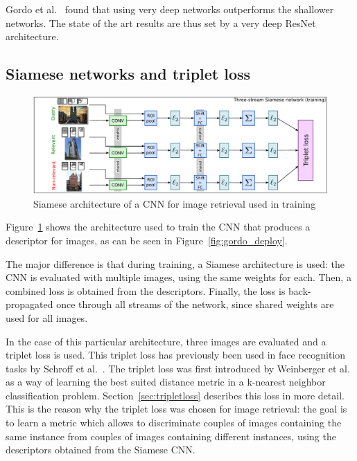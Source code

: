 Gordo et al.~\cite{gordo_deep_2016} found that using very deep networks
outperforms the shallower networks. The state of the art results are
thus set by a very deep ResNet architecture.

\subsection{Siamese networks and triplet loss}
\begin{figure}
\includegraphics[width=\textwidth]{img/gordo_deepimageretrievalarc.png}
\caption{Siamese architecture of a CNN for image retrieval used in
training~\cite{gordo_deep_2016}
\label{fig:gordo_train}}
\end{figure}

Figure~\ref{fig:gordo_train} shows the architecture used to train the CNN
that produces a descriptor for images, as can be seen in
Figure~\ref{fig:gordo_deploy}.

The major difference is that during training, a Siamese architecture is
used: the CNN is evaluated with multiple images, using the same weights
for each. Then, a combined loss is obtained from the descriptors.
Finally, the loss is back-propagated once through all streams of the network,
since shared weights are used for all images.

In the case of this particular architecture, three images are evaluated
and a triplet loss is used. This triplet loss has previously been used
in face recognition tasks by Schroff et al.~\cite{schroff_facenet:_2015}.
The triplet loss was first introduced by
Weinberger et al.~\cite{weinberger_distance_2006} as a way of learning
the best suited distance metric in a k-nearest neighbor classification
problem. Section~\ref{sec:tripletloss} describes this loss in more detail.
This is the reason why the triplet loss was chosen for image retrieval:
the goal is to learn a metric which allows to discriminate couples of
images containing the same instance from couples of images containing
different instances, using the descriptors obtained from the Siamese
CNN.

